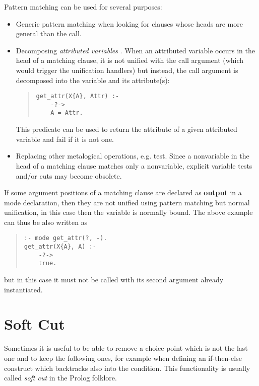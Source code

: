 Pattern matching can be used for several purposes:
\begin{itemize}
\item Generic pattern matching when looking for clauses
whose heads are more general than the call.

\item Decomposing {\it attributed variables} \cite{eclipseext}.
When an attributed variable occurs in the head of a matching clause,
it is not unified with the call argument (which would trigger
the unification handlers) but instead, the call argument
is decomposed into the variable and its attribute(s):
\begin{quote}
\begin{verbatim}
get_attr(X{A}, Attr) :-
    -?->
    A = Attr.
\end{verbatim}
\end{quote}
This predicate can be used to return the attribute of a given
attributed variable and fail if it is not one.

\item Replacing other metalogical operations, e.g. 
test. Since a nonvariable in the head of a matching clause
matches only a nonvariable, explicit variable tests and/or cuts
may become obsolete.
\end{itemize}

If some argument positions of a matching clause are declared
as {\bf output} in a mode declaration, then they are not
unified using pattern matching but normal unification,
in this case then the variable is normally bound.
The above example can thus be also written as
\begin{quote}
\begin{verbatim}
:- mode get_attr(?, -).
get_attr(X{A}, A) :-
    -?->
    true.
\end{verbatim}
\end{quote}
but in this case it must not be called with its second argument
already instantiated.


\section{Soft Cut}
Sometimes it is useful to be able to remove a choice point which is
not the last one and to keep the following ones, for example
when defining an if-then-else construct which backtracks also
into the condition.
This functionality is usually called {\it soft cut} in the Prolog
folklore.

